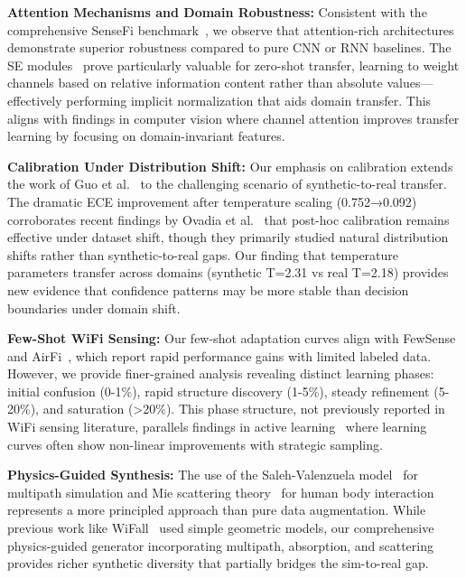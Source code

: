 \documentclass[journal]{IEEEtran}
\begin{document}
\textbf{Attention Mechanisms and Domain Robustness:} Consistent with the comprehensive SenseFi benchmark~\cite{yang2023sensefi}, we observe that attention-rich architectures demonstrate superior robustness compared to pure CNN or RNN baselines. The SE modules~\cite{se_networks2018} prove particularly valuable for zero-shot transfer, learning to weight channels based on relative information content rather than absolute values—effectively performing implicit normalization that aids domain transfer. This aligns with findings in computer vision where channel attention improves transfer learning by focusing on domain-invariant features.

\textbf{Calibration Under Distribution Shift:} Our emphasis on calibration extends the work of Guo et al.~\cite{calibration_guo2017} to the challenging scenario of synthetic-to-real transfer. The dramatic ECE improvement after temperature scaling (0.752→0.092) corroborates recent findings by Ovadia et al.~\cite{ovadia2019trust} that post-hoc calibration remains effective under dataset shift, though they primarily studied natural distribution shifts rather than synthetic-to-real gaps. Our finding that temperature parameters transfer across domains (synthetic T=2.31 vs real T=2.18) provides new evidence that confidence patterns may be more stable than decision boundaries under domain shift.

\textbf{Few-Shot WiFi Sensing:} Our few-shot adaptation curves align with FewSense~\cite{fewsense2022} and AirFi~\cite{airfi2022}, which report rapid performance gains with limited labeled data. However, we provide finer-grained analysis revealing distinct learning phases: initial confusion (0-1\%), rapid structure discovery (1-5\%), steady refinement (5-20\%), and saturation (>20\%). This phase structure, not previously reported in WiFi sensing literature, parallels findings in active learning~\cite{settles2009active} where learning curves often show non-linear improvements with strategic sampling.

\textbf{Physics-Guided Synthesis:} The use of the Saleh-Valenzuela model~\cite{saleh1987statistical} for multipath simulation and Mie scattering theory~\cite{mie1908beitrage} for human body interaction represents a more principled approach than pure data augmentation. While previous work like WiFall~\cite{wifall2016} used simple geometric models, our comprehensive physics-guided generator incorporating multipath, absorption, and scattering provides richer synthetic diversity that partially bridges the sim-to-real gap.
\end{document}
